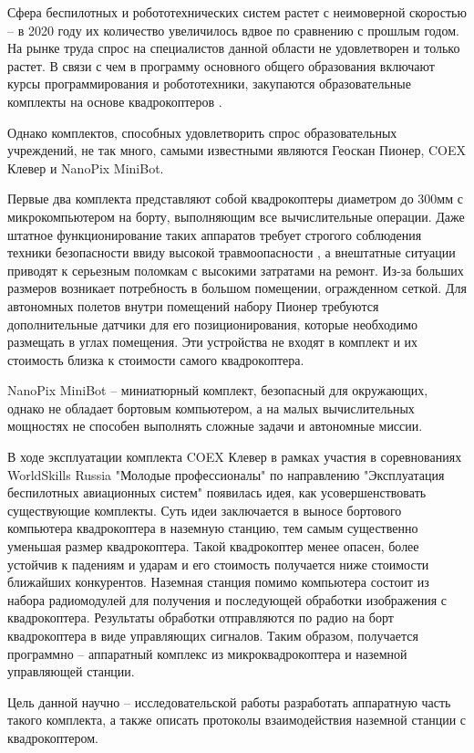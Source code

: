 Сфера беспилотных и робототехнических систем растет с неимоверной скоростью -- в 2020 году их количество увеличилось вдвое по сравнению с прошлым годом. На рынке труда спрос на специалистов данной области не удовлетворен и только растет. В связи с чем в программу основного общего образования включают курсы программирования и робототехники, закупаются образовательные комплекты на основе квадрокоптеров \cite{minobr}.

Однако комплектов, способных удовлетворить спрос образовательных учреждений, не так много, самыми известными являются Геоскан Пионер, COEX Клевер и NanoPix MiniBot.

Первые два комплекта представляют собой квадрокоптеры диаметром до 300мм с микрокомпьютером на борту, выполняющим все вычислительные операции. Даже штатное функционирование таких аппаратов требует строгого соблюдения техники безопасности ввиду высокой травмоопасности , а внештатные ситуации приводят к серьезным поломкам с высокими затратами на ремонт. Из-за больших размеров возникает потребность в большом помещении, огражденном сеткой. Для автономных полетов внутри помещений набору Пионер требуются дополнительные датчики для его позиционирования, которые необходимо размещать в углах помещения. Эти устройства не входят в комплект и их стоимость близка к стоимости самого квадрокоптера.

NanoPix MiniBot -- миниатюрный комплект, безопасный для окружающих, однако не обладает бортовым компьютером, а на малых вычислительных мощностях не способен выполнять сложные задачи и автономные миссии.

В ходе эксплуатации комплекта COEX Клевер в рамках участия в соревнованиях WorldSkills Russia "Молодые профессионалы" по направлению "Эксплуатация беспилотных авиационных систем" появилась идея, как усовершенствовать существующие комплекты.
Суть идеи заключается в выносе бортового компьютера квадрокоптера в наземную станцию, тем самым существенно уменьшая размер квадрокоптера. Такой квадрокоптер менее опасен, более устойчив к падениям и ударам и его стоимость получается ниже стоимости ближайших конкурентов. Наземная станция помимо компьютера состоит из набора радиомодулей для получения и последующей обработки изображения с квадрокоптера. Результаты обработки отправляются по радио на борт квадрокоптера в виде управляющих сигналов. Таким образом, получается программно -- аппаратный комплекс из микроквадрокоптера и наземной управляющей станции.

Цель данной научно -- исследовательской работы разработать аппаратную часть такого комплекта, а также описать протоколы взаимодействия наземной станции с квадрокоптером.
